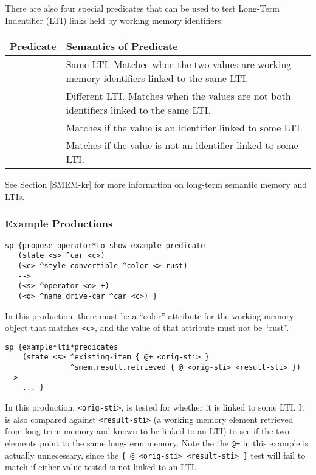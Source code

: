 There are also four special predicates that can be used to test Long-Term Indentifier (LTI) links held by working memory identifiers: 

\begin{tabularx}{\textwidth}{| l | X |} 
	\hline
	\bf{Predicate} &  \bf{Semantics of Predicate} \\ 
	\hline
	\soar{@}  & Same LTI. Matches when the two values are working memory identifiers linked to the same LTI. \\
	\soar{!@} & Different LTI.  Matches when the values are not both identifiers linked to the same LTI. \\
	\soar{@+} & Matches if the value is an identifier linked to some LTI. \\
	\soar{@-} & Matches if the value is not an identifier linked to some LTI. \\
	\hline 
\end{tabularx} 
\vspace{10pt}

See Section \ref{SMEM-kr} for more information on long-term semantic memory and LTIs.

\subsubsection*{Example Productions}

\begin{verbatim}
sp {propose-operator*to-show-example-predicate
   (state <s> ^car <c>)
   (<c> ^style convertible ^color <> rust)
   -->
   (<s> ^operator <o> +)
   (<o> ^name drive-car ^car <c>) }
\end{verbatim}

In this production, there must be a ``color'' attribute for the working memory object that matches \verb+<c>+, and the value of that attribute must not be ``rust''. 

\begin{verbatim}
sp {example*lti*predicates
    (state <s> ^existing-item { @+ <orig-sti> }
               ^smem.result.retrieved { @ <orig-sti> <result-sti> })
-->
    ... }
\end{verbatim}

In this production, \verb|<orig-sti>|, is tested for whether it is linked to some LTI. It is also compared against \verb|<result-sti>| (a working memory element retrieved from long-term memory and known to be linked to an LTI) to see if the two elements point to the same long-term memory. Note the the \verb|@+| in this example is actually unnecessary, since the \verb|{ @ <orig-sti> <result-sti> }| test will fail to match if either value tested is not linked to an LTI.

